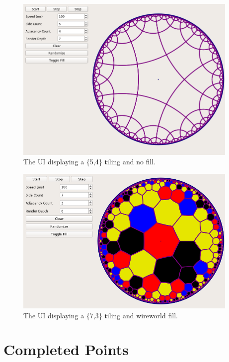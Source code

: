 \documentclass[letterpaper,12pt]{article}
\begin{document}
\begin{figure}[H]
\vspace{-5em}\includegraphics[width=29em]{../ui1.png}
\caption{The UI displaying a \{5,4\} tiling and no fill.}
\centering
\end{figure}

\begin{figure}[H]
\includegraphics[width=29em]{../ui2.png}
\caption{The UI displaying a \{7,3\} tiling and wireworld fill.}
\centering
\end{figure}


\section*{Completed Points}
\end{document}
